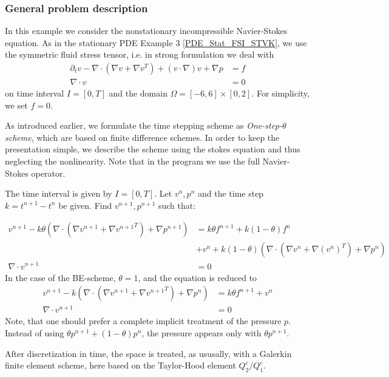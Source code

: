 \subsubsection{General problem description}
In this example we consider the nonstationary incompressible Navier-Stokes equation. As in the stationary PDE Example 3 \ref{PDE_Stat_FSI_STVK},
we use the symmetric fluid stress tensor, i.e. 
in strong formulation we deal with 
\begin{align*}
\partial_t v -\nabla\cdot (\nabla v + \nabla v^{T}) + (v\cdot\nabla)v  +\nabla p &= f \\
\nabla\cdot v &= 0 
\end{align*}
on time interval $I=[0,T]$ and the domain 
$\Omega = [-6,6]\times [0,2]$. For simplicity,  we set $f=0$.


As introduced earlier, we formulate the time stepping scheme as \textit{One-step-$\theta$ scheme},
which are based on finite difference schemes. In order to keep the presentation simple, we describe the scheme using the stokes equation and thus neglecting the nonlinearity. Note that in the program we use the full Navier-Stokes operator.

The time interval is given by $I=[0,T]$. Let $v^n,p^n$ and the time
step $k=t^{n+1}-t^n$ be given. Find $v^{n+1}, p^{n+1}$ such that:

\begin{align*}
v^{n+1} - k\theta \left(\nabla\cdot (\nabla v^{n+1} + \nabla {v^{n+1}}^T) + \nabla p^{n+1}\right) &=
k\theta f^{n+1} + k(1-\theta)f^{n}\\
&+  v^n + k(1-\theta) \left(\nabla\cdot (\nabla v^n + \nabla (v^n)^{T}) 
+ \nabla p^n\right) \\
\nabla \cdot v^{n+1} &= 0 
\end{align*}
In the case of the BE-scheme, $\theta = 1$, and the equation is reduced to
\begin{align*}
v^{n+1} - k (\nabla\cdot (\nabla v^{n+1} + \nabla {v^{n+1}}^{T}) + \nabla p^n) &=
k\theta f^{n+1} +  v^n  \\
\nabla \cdot v^{n+1} &= 0
\end{align*}
Note, that one should prefer a complete implicit treatment of the
pressure $p$. Instead of using $\theta p^{n+1} + (1-\theta)p^n$, the pressure
appears only with $\theta p^{n+1}$.

After discretization in time, the space is treated, as ususally, with 
a Galerkin finite element scheme, here based on the Taylor-Hood element 
$Q_2^c / Q_1^c$.


